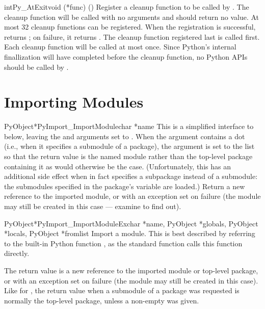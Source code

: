 \documentclass{manual}
\begin{document}
\begin{cfuncdesc}{int}{Py_AtExit}{void (*func) ()}
Register a cleanup function to be called by
.
The cleanup function will be called with no arguments and should
return no value.  At most 32 cleanup
functions can be registered.
When the registration is successful,  returns
; on failure, it returns .  The cleanup function
registered last is called first.  Each cleanup function will be called
at most once.  Since Python's internal finallization will have
completed before the cleanup function, no Python APIs should be called
by .
\end{cfuncdesc}


\section{Importing Modules \label{importing}}

\begin{cfuncdesc}{PyObject*}{PyImport_ImportModule}{char *name}
This is a simplified interface to
 below, leaving the
 and  arguments set to \NULL{}.  When the
 argument contains a dot (i.e., when it specifies a
submodule of a package), the  argument is set to the
list \code{['*']} so that the return value is the named module rather
than the top-level package containing it as would otherwise be the
case.  (Unfortunately, this has an additional side effect when
 in fact specifies a subpackage instead of a submodule: the
submodules specified in the package's  variable are
loaded.)  Return a
new reference to the imported module, or
\NULL{} with an exception set on failure (the module may still be
created in this case --- examine  to find out).
\end{cfuncdesc}

\begin{cfuncdesc}{PyObject*}{PyImport_ImportModuleEx}{char *name, PyObject *globals, PyObject *locals, PyObject *fromlist}
Import a module.  This is best described by referring to the built-in
Python function , as
the standard  function calls this function
directly.

The return value is a new reference to the imported module or
top-level package, or \NULL{} with an exception set on failure
(the module may still be created in this case).  Like for
, the return value when a submodule of a
package was requested is normally the top-level package, unless a
non-empty  was given.
\end{cfuncdesc}
\end{document}
